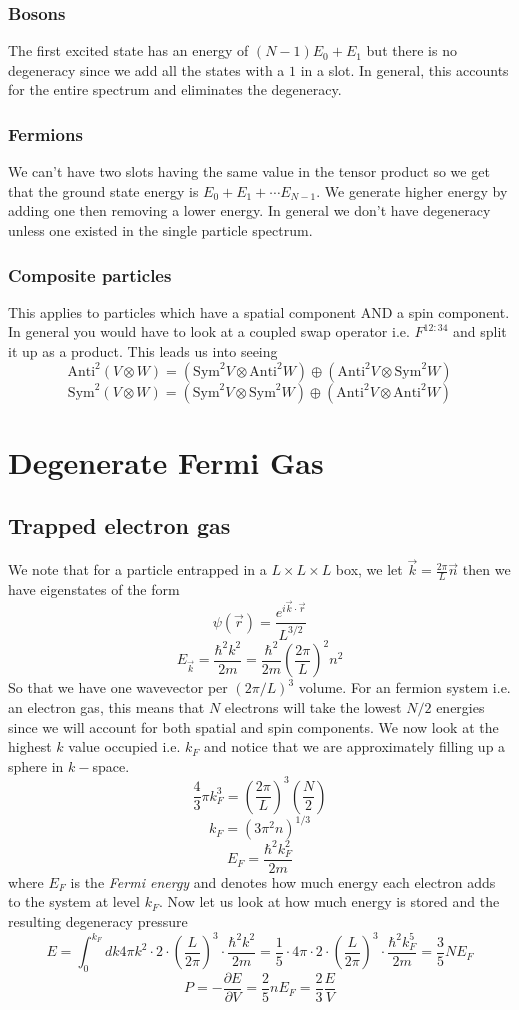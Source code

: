 \documentclass{article}
\begin{document}
\subsubsection{Bosons}
The first excited state has an energy of $(N-1)E_0 + E_1$ but there is no degeneracy since we add all the states with a $1$ in a slot. In general, this accounts for the entire spectrum and eliminates the degeneracy. 
\subsubsection{Fermions}
We can't have two slots having the same value in the tensor product so we get that the ground state energy is $E_0+E_1+\cdots E_{N-1}$. We generate higher energy by adding one then removing a lower energy. In general we don't have degeneracy unless one existed in the single particle spectrum.
\subsubsection{Composite particles}
This applies to particles which have a spatial component AND a spin component. In general you would have to look at a coupled swap operator i.e. $F^{12:34}$ and split it up as a product. This leads us into seeing 
$$\text{Anti}^2(V\otimes W)=(\text{Sym}^2 V\otimes \text{Anti}^2 W)\oplus (\text{Anti}^2 V\otimes \text{Sym}^2 W)$$
$$\text{Sym}^2(V\otimes W)=(\text{Sym}^2 V\otimes \text{Sym}^2 W)\oplus (\text{Anti}^2 V\otimes \text{Anti}^2 W)$$
\section{Degenerate Fermi Gas}
\subsection{Trapped electron gas}
We note that for a particle entrapped in a $L\times L\times L$ box, we let $\vec k = \frac{2\pi}{L}\vec n$ then we have eigenstates of the form 
$$\psi(\vec r) = \frac{e^{i\vec k\cdot \vec r}}{L^{3/2}}$$
$$E_{\vec k} = \frac{\hbar^2k^2}{2m}=\frac{\hbar^2}{2m} \left(\frac{2\pi}{L}\right)^2 n^2$$ 
So that we have one wavevector per $(2\pi/L)^3$ volume. For an fermion system i.e. an electron gas, this means that $N$ electrons will take the lowest $N/2$ energies since we will account for both spatial and spin components. We now look at the highest $k$ value occupied i.e. $k_F$ and notice that we are approximately filling up a sphere in $k-$space.
$$\frac{4}{3}\pi k_F^3 =\left(\frac{2\pi}{L}\right)^3\left(\frac{N}{2}\right)$$
$$k_F=(3\pi^2 n)^{1/3}$$
$$E_{F} = \frac{\hbar^2k_F^2}{2m}$$
where $E_F$ is the \emph{Fermi energy} and denotes how much energy each electron adds to the system at level $k_F$. Now let us look at how much energy is stored and the resulting degeneracy pressure
$$E=\int_0^{k_F} dk4\pi k^2 \cdot 2\cdot \left(\frac{L}{2\pi}\right)^3\cdot \frac{\hbar^2 k^2}{2m}=\frac{1}{5}\cdot 4\pi \cdot 2\cdot \left(\frac{L}{2\pi}\right)^3\cdot \frac{\hbar^2 k_F^5}{2m} = \frac{3}{5} NE_F$$
$$P=-\frac{\partial E}{\partial V} = \frac{2}{5}nE_F =\frac{2}{3}\frac{E}{V}$$
\end{document}
